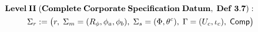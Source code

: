 \documentclass[preview]{standalone}
\begin{document}
\begin{align*}
\special{dvisvgm:raw <g id='unique000'>}\mathbf{Level\;II\;(Complete\;Corporate\;Specification\;Datum,\;Def\;3.7):}\\\Sigma_r := \big(r,\; \Sigma_m=(R_\phi,\phi_a,\phi_b),\; \Sigma_s=(\Phi,\theta^c),\; \Gamma=(U_c,\iota_c),\; \mathsf{Comp}\big)\special{dvisvgm:raw </g>}
\end{align*}
\end{document}

